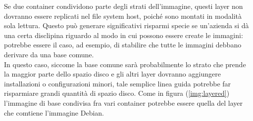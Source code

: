Se due container condividono parte degli strati dell’immagine, questi layer non dovranno essere replicati nel file system host, poiché sono montati in modalità sola lettura. Questo può generare significativi risparmi specie se un’azienda si dà una certa disclipina riguardo al modo in cui possono essere create le immagini: potrebbe essere il caso, ad esempio, di stabilire che tutte le immagini debbano derivare da una base comune.\\In questo caso, siccome la base comune sarà probabilmente lo strato che prende la maggior parte dello spazio disco e gli altri layer dovranno aggiungere installazioni o configurazioni minori, tale semplice linea guida potrebbe far risparmiare grandi quantità di spazio disco. Come in figura (\ref{img:layered}) l'immagine di base condivisa fra vari container potrebbe essere quella del layer che comtiene l'immagine Debian. 
